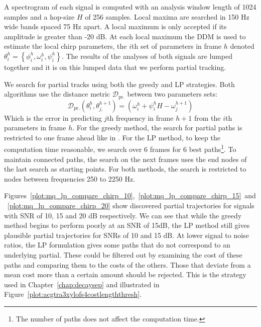 A spectrogram of each signal is computed with an analysis window length of 1024
samples and a hop-size $H$ of 256 samples. Local maxima are searched in 150 Hz
wide bands spaced 75 Hz apart. A local maximum is only accepted if its amplitude
is greater than -20 dB. At each local maximum the DDM is used to estimate the
local chirp parameters, the $i$th set of parameters in frame $h$ denoted
$\theta_{i}^{h} = \left\{ \phi_{i}^{h} , \omega_{i}^{h} , \psi_{i}^{h}
\right\}$. The results of the analyses of both signals are lumped together and
it is on this lumped data that we perform partial tracking.

We search for partial tracks using both the greedy and LP strategies. Both
algorithms use the distance metric $\mathcal{D}_{\text{pr.}}$ between two parameters sets:
\[
    \mathcal{D}_{\text{pr.}} \left( \theta_{i}^{h},
    \theta_{j,}^{h+1} \right) = \left( \omega_{i}^{h} +
    \psi_{i}^{h} H - \omega_{j}^{h+1} \right)
\]
Which is the error in predicting $j$th frequency in frame $h+1$ from the $i$th
parameters in frame $h$. For the greedy method, the search for partial paths is
restricted to one frame ahead like in \cite{mcaulay1986speech}. For the LP
method, to keep the computation time reasonable, we search over 6 frames for 6
best paths\footnote{The number of paths does not affect the computation time.}.
To maintain connected paths, the search on the next frames uses the end nodes of
the last search as starting points. For both methods, the search is restricted
to nodes between frequencies 250 to 2250 Hz.

Figures~\ref{plot:mq_lp_compare_chirp_10},~\ref{plot:mq_lp_compare_chirp_15}~and~\ref{plot:mq_lp_compare_chirp_20}
show discovered partial trajectories for signals with SNR of 10, 15 and 20 dB
respectively. We can see that while the greedy method begins to perform poorly
at an SNR of 15dB, the LP method still gives plausible partial trajectories for
SNRs of 10 and 15 dB. At lower signal to noise ratios, the LP formulation gives
some paths that do not correspond to an underlying partial. These could be filtered
out by examining the cost of these paths and comparing them to the costs of the
others. Those that deviate from a mean cost more than a certain amount should be
rejected. This is the strategy used in Chapter~\ref{chap:decaysep} and
illustrated in Figure~\ref{plot:acgtra3xylofs4costlengththresh}.

